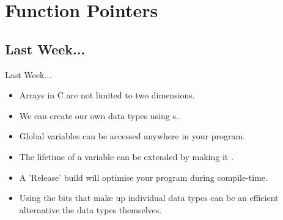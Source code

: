 \documentclass[smaller,handout,table]{beamer}
\subtitle{Lecture 5 of 5}
\begin{document}
{
\begin{frame}
  \titlepage
\end{frame}
}


\section{Function Pointers}
\subsection{Last Week...}
\begin{frame}{Last Week...}
\begin{itemize}
\item Arrays in C are not limited to two dimensions.
\item We can create our own data types using s.
\item Global variables can be accessed anywhere in your program.
\item The lifetime of a variable can be extended by making it .
\item A 'Release' build will optimise your program during compile-time.
\item Using the bits that make up individual data types can be an efficient alternative the data types themselves.
\end{itemize}
\end{frame}
\end{document}
